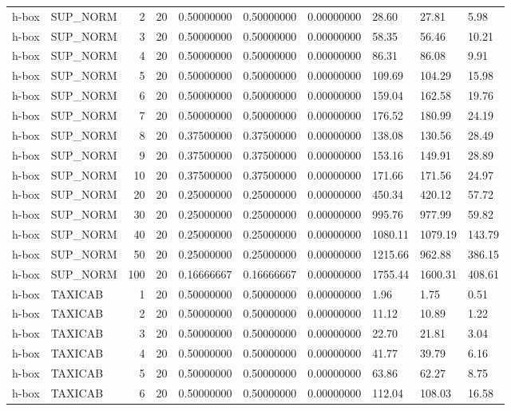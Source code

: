 \begin{longtable}{llrrllllll}
h-box & SUP\_NORM & 2 & 20 & 0.50000000 & 0.50000000 & 0.00000000 & 28.60 & 27.81 & 5.98 \\
h-box & SUP\_NORM & 3 & 20 & 0.50000000 & 0.50000000 & 0.00000000 & 58.35 & 56.46 & 10.21 \\
h-box & SUP\_NORM & 4 & 20 & 0.50000000 & 0.50000000 & 0.00000000 & 86.31 & 86.08 & 9.91 \\
h-box & SUP\_NORM & 5 & 20 & 0.50000000 & 0.50000000 & 0.00000000 & 109.69 & 104.29 & 15.98 \\
h-box & SUP\_NORM & 6 & 20 & 0.50000000 & 0.50000000 & 0.00000000 & 159.04 & 162.58 & 19.76 \\
h-box & SUP\_NORM & 7 & 20 & 0.50000000 & 0.50000000 & 0.00000000 & 176.52 & 180.99 & 24.19 \\
h-box & SUP\_NORM & 8 & 20 & 0.37500000 & 0.37500000 & 0.00000000 & 138.08 & 130.56 & 28.49 \\
h-box & SUP\_NORM & 9 & 20 & 0.37500000 & 0.37500000 & 0.00000000 & 153.16 & 149.91 & 28.89 \\
h-box & SUP\_NORM & 10 & 20 & 0.37500000 & 0.37500000 & 0.00000000 & 171.66 & 171.56 & 24.97 \\
h-box & SUP\_NORM & 20 & 20 & 0.25000000 & 0.25000000 & 0.00000000 & 450.34 & 420.12 & 57.72 \\
h-box & SUP\_NORM & 30 & 20 & 0.25000000 & 0.25000000 & 0.00000000 & 995.76 & 977.99 & 59.82 \\
h-box & SUP\_NORM & 40 & 20 & 0.25000000 & 0.25000000 & 0.00000000 & 1080.11 & 1079.19 & 143.79 \\
h-box & SUP\_NORM & 50 & 20 & 0.25000000 & 0.25000000 & 0.00000000 & 1215.66 & 962.88 & 386.15 \\
h-box & SUP\_NORM & 100 & 20 & 0.16666667 & 0.16666667 & 0.00000000 & 1755.44 & 1600.31 & 408.61 \\
h-box & TAXICAB & 1 & 20 & 0.50000000 & 0.50000000 & 0.00000000 & 1.96 & 1.75 & 0.51 \\
h-box & TAXICAB & 2 & 20 & 0.50000000 & 0.50000000 & 0.00000000 & 11.12 & 10.89 & 1.22 \\
h-box & TAXICAB & 3 & 20 & 0.50000000 & 0.50000000 & 0.00000000 & 22.70 & 21.81 & 3.04 \\
h-box & TAXICAB & 4 & 20 & 0.50000000 & 0.50000000 & 0.00000000 & 41.77 & 39.79 & 6.16 \\
h-box & TAXICAB & 5 & 20 & 0.50000000 & 0.50000000 & 0.00000000 & 63.86 & 62.27 & 8.75 \\
h-box & TAXICAB & 6 & 20 & 0.50000000 & 0.50000000 & 0.00000000 & 112.04 & 108.03 & 16.58 \\

\end{longtable}
